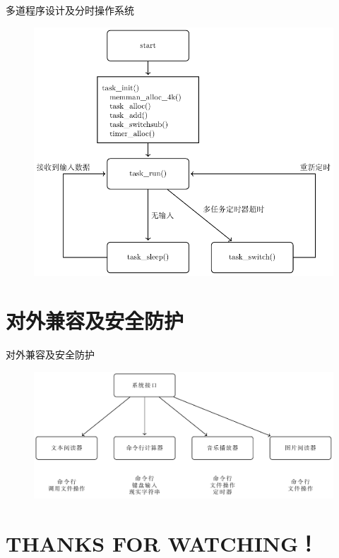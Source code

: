 \documentclass{beamer}
\begin{document}
    \begin{frame}{多道程序设计及分时操作系统}
      \begin{figure}[H]
        \centering
        \includegraphics[width=.8\textwidth]{../Fig/func/multi.pdf}
      \end{figure}
    \end{frame}
    
    \section{对外兼容及安全防护}
      \begin{frame}{对外兼容及安全防护}
        \begin{figure}[H]
          \centering
          \includegraphics[width=.8\textwidth]{../Fig/sc.pdf}
        \end{figure}
      \end{frame}

    \section{THANKS FOR WATCHING！}
    
    
\end{document}
